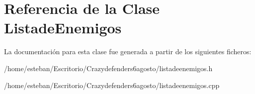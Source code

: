 \hypertarget{class_listade_enemigos}{\section{Referencia de la Clase Listade\+Enemigos}
\label{class_listade_enemigos}
}


La documentación para esta clase fue generada a partir de los siguientes ficheros\+:\begin{DoxyCompactItemize}
\item 
/home/esteban/\+Escritorio/\+Crazydefenders6agosto/listadeenemigos.\+h\item 
/home/esteban/\+Escritorio/\+Crazydefenders6agosto/listadeenemigos.\+cpp\end{DoxyCompactItemize}
